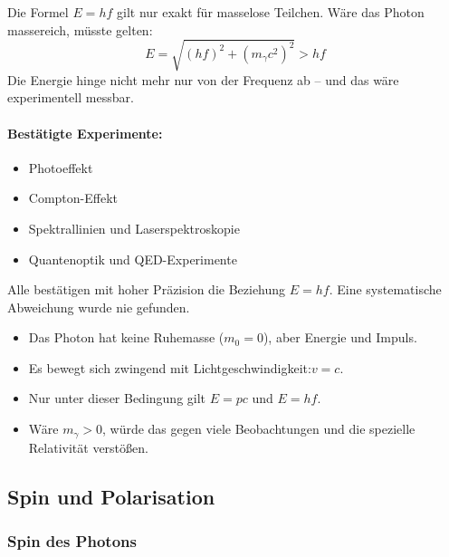 Die Formel $E = hf$ gilt nur exakt f\"ur masselose Teilchen. W\"are das Photon massereich, m\"usste gelten:
\begin{equation}
	E = \sqrt{(hf)^2 + (m_\gamma c^2)^2} > hf
\end{equation}
Die Energie hinge nicht mehr nur von der Frequenz ab -- und das w\"are experimentell messbar.

\paragraph*{Best\"atigte Experimente:}
\begin{itemize}
	\item Photoeffekt
	\item Compton-Effekt
	\item Spektrallinien und Laserspektroskopie
	\item Quantenoptik und QED-Experimente
\end{itemize}
Alle best\"atigen mit hoher Pr\"azision die Beziehung $E = hf$. Eine systematische Abweichung wurde nie gefunden.
\vspace{1em}
\begin{tcolorbox}[physikbox, title=Fazit: Warum das Photon masselos ist]
	\begin{itemize}
		\label{box:Warum das Photon}
		\item Das Photon hat keine Ruhemasse ($m_0 = 0$), aber Energie und Impuls.
		\item Es bewegt sich zwingend mit Lichtgeschwindigkeit:\newline $v = c$.
		\item Nur unter dieser Bedingung gilt $E = pc$ und $E = hf$.
		\item W\"are $m_\gamma > 0$, w\"urde das gegen viele Beobachtungen und die spezielle Relativit\"at verstößen.
	\end{itemize}
\end{tcolorbox}
\vspace{1em}
\newpage
\noindent
\subsection{Spin und Polarisation}

\subsubsection{Spin des Photons}

